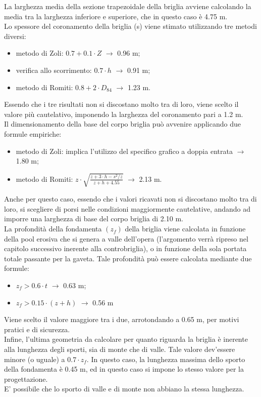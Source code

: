 La larghezza media della sezione trapezoidale della briglia avviene calcolando la media tra la larghezza inferiore e superiore, che in questo caso è 4.75 m.\\
Lo spessore del coronamento della briglia (s) viene stimato utilizzando tre metodi diversi:
\begin{itemize}
    \item metodo di Zoli: $0.7 + 0.1 \cdot Z$ $\rightarrow$ 0.96 m;
    \item verifica allo scorrimento: $0.7 \cdot h$ $\rightarrow$ 0.91 m;
    \item metodo di Romiti: $0.8 + 2 \cdot D_{84}$ $\rightarrow$ 1.23 m.
\end{itemize}
Essendo che i tre risultati non si discostano molto tra di loro, viene scelto il valore più cautelativo, imponendo la larghezza del coronamento pari a 1.2 m.\\
Il dimensionamento della base del corpo briglia può avvenire applicando due formule empiriche:
\begin{itemize}
    \item metodo di Zoli: implica l'utilizzo del specifico grafico a doppia entrata $\rightarrow$ 1.80 m;
    \item metodo di Romiti: $z \cdot \sqrt{\frac{z+3 \cdot h-s^2/z}{z+h+4.55}}$ $\rightarrow$ 2.13 m.
\end{itemize}
Anche per questo caso, essendo che i valori ricavati non si discostano molto tra di loro, si scegliere di porsi nelle condizioni maggiormente cautelative, andando ad imporre una larghezza di base del corpo briglia di 2.10 m.\\
La profondità della fondamenta $(z_f)$ della briglia viene calcolata in funzione della pool erosiva che si genera a valle dell'opera (l'argomento verrà ripreso nel capitolo successivo inerente alla controbriglia), o in funzione della sola portata totale passante per la gaveta. Tale profondità può essere calcolata mediante due formule:
\begin{itemize}
    \item $z_f > 0.6 \cdot t$ $\rightarrow$ 0.63 m;
    \item $z_f > 0.15 \cdot (z+h)$ $\rightarrow$ 0.56 m
\end{itemize}
Viene scelto il valore maggiore tra i due, arrotondando a 0.65 m, per motivi pratici e di sicurezza.\\
Infine, l'ultima geometria da calcolare per quanto riguarda la briglia è inerente alla lunghezza degli sporti, sia di monte che di valle. Tale valore dev'essere minore (o uguale) a $0.7 \cdot z_f$. In questo caso, la lunghezza massima dello sporto della fondamenta è 0.45 m, ed in questo caso si impone lo stesso valore per la progettazione.\\
E' possibile che lo sporto di valle e di monte non abbiano la stessa lunghezza. 

